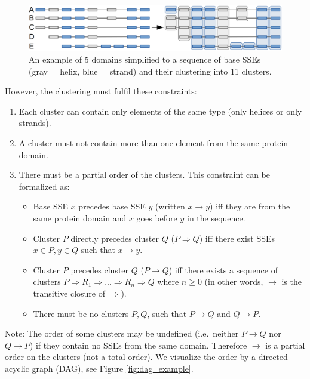 \documentclass{article}
\begin{document}
\begin{figure}[h!]
  \centering\includegraphics[width=\linewidth]{figures/clusters.png}
  \caption{An example of 5 domains simplified to a sequence of base SSEs 
  (gray = helix, blue = strand) and their clustering into 11 clusters.}
  \label{fig:clusters}
\end{figure}

However, the clustering must fulfil these constraints:

\begin{enumerate}
\def\labelenumi{\arabic{enumi}.}
\item
  Each cluster can contain only elements of the same type (only helices
  or only strands).
\item
  A cluster must not contain more than one element from the same protein
  domain.
\item
  There must be a partial order of the clusters. This constraint can be formalized as:
  \begin{itemize}
    \item
      Base SSE \(x\) precedes base SSE \(y\) (written \(x \rightarrow y\)) iff they
      are from the same protein domain and \(x\) goes before \(y\) in the sequence.
    \item
      Cluster \(P\) directly precedes cluster \(Q\) (\(P \Rightarrow Q\)) iff there
      exist SSEs \(x \in P, y \in Q\) such that \(x \rightarrow y\).
    \item
      Cluster \(P\) precedes cluster \(Q\) (\(P \rightarrow Q\)) iff there
      exists a sequence of clusters \(P \Rightarrow R_1 \Rightarrow ... 
      \Rightarrow R_n \Rightarrow Q\) where \(n \geq 0\) (in other words, \(\rightarrow\) 
      is the transitive closure of \(\Rightarrow\)).
    \item
      There must be no clusters \(P, Q\), such that
      \(P \rightarrow Q\) and \(Q \rightarrow P\).
  \end{itemize}
\end{enumerate}

Note: The order of some clusters may be undefined (i.e.~neither 
\(P \rightarrow Q\) nor \(Q \rightarrow P\)) if they contain no SSEs 
from the same domain. Therefore \(\rightarrow\) is a partial order on the clusters (not a total order).
We visualize the order by a directed acyclic graph (DAG), see Figure \ref{fig:dag_example}.
\end{document}
